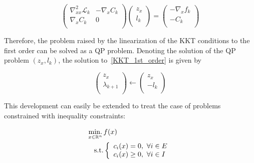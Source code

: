 \begin{equation}
  \begin{pmatrix}
      \nabla_{xx}^2\mathcal{L}_k & -\nabla_x C_k\\
      \nabla_x C_k & 0\\
  \end{pmatrix}
  \begin{pmatrix}
      z_x\\
      l_k\\
  \end{pmatrix}
  =
  \begin{pmatrix}
      - \nabla_{x}f_k\\
      - C_k\\
  \end{pmatrix}
\end{equation}


Therefore, the problem raised by the linearization of the KKT conditions to the first order can be solved as a QP problem.
Denoting the solution of the QP problem $(z_x, l_k)$, the solution to~\ref{KKT_1st_order} is given by

\begin{equation}
  \begin{pmatrix}
      z_x\\
      \lambda_{k+1}\\
  \end{pmatrix}
  \leftarrow
  \begin{pmatrix}
      z_x\\
      -l_k\\
  \end{pmatrix}
\end{equation}

This development can easily be extended to treat the case of problems constrained with inequality constraints:

\begin{equation}
\label{eq:prob_with_ineq}
\begin{aligned}
  \operatorname*{min.}_{x\in\mathbb{R}^n}{}&{f(x)}\\
  \text{s.t.}&
  \left\{
  \begin{array}{l}
    c_i(x) = 0,\ \forall i\in{E}\\
    c_i(x) \geq 0,\ \forall i\in{I}\\
  \end{array}
  \right.
\end{aligned}
\end{equation}


